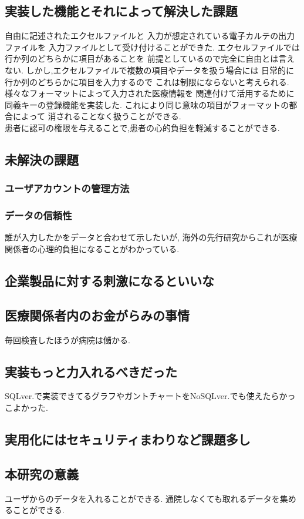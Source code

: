 \subsection{実装した機能とそれによって解決した課題}
  自由に記述されたエクセルファイルと
  入力が想定されている電子カルテの出力ファイルを
  入力ファイルとして受け付けることができた.
  エクセルファイルでは行か列のどちらかに項目があることを
  前提としているので完全に自由とは言えない.
  しかし,エクセルファイルで複数の項目やデータを扱う場合には
  日常的に行か列のどちらかに項目を入力するので
  これは制限にならないと考えられる.
  \\
  様々なフォーマットによって入力された医療情報を
  関連付けて活用するために同義キーの登録機能を実装した.
  これにより同じ意味の項目がフォーマットの都合によって
  消されることなく扱うことができる.
  \\
  患者に認可の権限を与えることで,患者の心的負担を軽減することができる.



\subsection{未解決の課題}
  \subsubsection{ユーザアカウントの管理方法}


  \subsubsection{データの信頼性}
     誰が入力したかをデータと合わせて示したいが,
     海外の先行研究からこれが医療関係者の心理的負担になることがわかっている.
     \cite{bibi10}

 \subsection{企業製品に対する刺激になるといいな}

 \subsection{医療関係者内のお金がらみの事情}
   毎回検査したほうが病院は儲かる.

 \subsection{実装もっと力入れるべきだった}
     SQLver.で実装できてるグラフやガントチャートをNoSQLver.でも使えたらかっこよかった.

 \subsection{実用化にはセキュリティまわりなど課題多し}

 \subsection{本研究の意義}
   ユーザからのデータを入れることができる.
   通院しなくても取れるデータを集めることができる.
